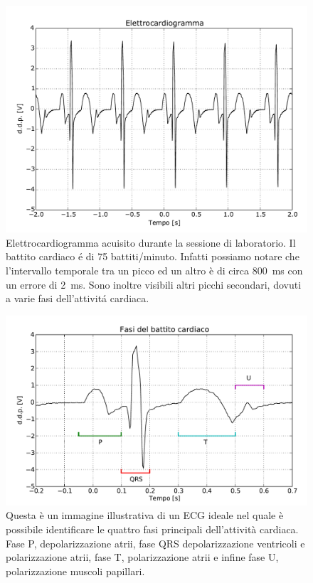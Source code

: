 \begin{figure}
    \includegraphics[height=0.4\textheight]{figure/ecg.pdf}
    \caption{Elettrocardiogramma acuisito durante la sessione di laboratorio. Il battito cardiaco é di 75 battiti/minuto. Infatti possiamo notare che l'intervallo temporale tra un picco ed un altro è di circa \SI{800}{\milli\second} con un errore di \SI{2}{\milli\second}. Sono inoltre visibili altri picchi secondari, dovuti a varie fasi dell'attivitá cardiaca.}
    \label{fig:ecg_normale}
\end{figure}

\begin{figure}
    \includegraphics[height=0.35\textheight]{figure/ecg_fasi.pdf}
    \caption{Questa è un immagine illustrativa di un ECG ideale nel quale è possibile identificare le quattro fasi principali dell'attività cardiaca. Fase P, depolarizzazione atrii, fase QRS depolarizzazione ventricoli e polarizzazione atrii, fase T, polarizzazione atrii e infine fase U, polarizzazione muscoli papillari.}
    \label{fig:ecg_ideale}
\end{figure}

